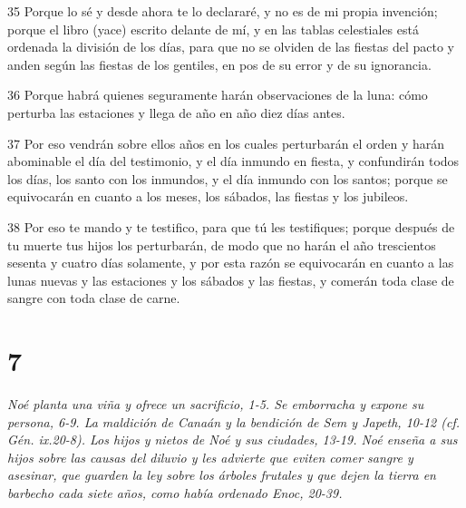 \par 35 Porque lo sé y desde ahora te lo declararé, y no es de mi propia invención; porque el libro (yace) escrito delante de mí, y en las tablas celestiales está ordenada la división de los días, para que no se olviden de las fiestas del pacto y anden según las fiestas de los gentiles, en pos de su error y de su ignorancia.
\par 36 Porque habrá quienes seguramente harán observaciones de la luna: cómo perturba las estaciones y llega de año en año diez días antes.
\par 37 Por eso vendrán sobre ellos años en los cuales perturbarán el orden y harán abominable el día del testimonio, y el día inmundo en fiesta, y confundirán todos los días, los santo con los inmundos, y el día inmundo con los santos; porque se equivocarán en cuanto a los meses, los sábados, las fiestas y los jubileos.
\par 38 Por eso te mando y te testifico, para que tú les testifiques; porque después de tu muerte tus hijos los perturbarán, de modo que no harán el año trescientos sesenta y cuatro días solamente, y por esta razón se equivocarán en cuanto a las lunas nuevas y las estaciones y los sábados y las fiestas, y comerán toda clase de sangre con toda clase de carne.

\chapter{7}

\par \textit{Noé planta una viña y ofrece un sacrificio, 1-5. Se emborracha y expone su persona, 6-9. La maldición de Canaán y la bendición de Sem y Japeth, 10-12 (cf. Gén. ix.20-8). Los hijos y nietos de Noé y sus ciudades, 13-19. Noé enseña a sus hijos sobre las causas del diluvio y les advierte que eviten comer sangre y asesinar, que guarden la ley sobre los árboles frutales y que dejen la tierra en barbecho cada siete años, como había ordenado Enoc, 20-39.}

